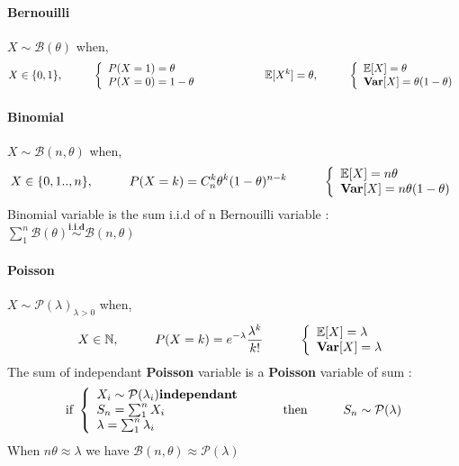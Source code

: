 \documentclass[a4paper,10pt]{article}
\begin{document}
\paragraph{Bernouilli} $X\sim \mathcal{B}(\theta)$ when, 
\[
X \in \{0,1\} , 
\hspace{10mm}
\left\{
\begin{array}{l}
P(X=1)=\theta \\
P(X=0)=1-\theta
\end{array}\right.
\hspace{20mm}
\mathbb{E}[X^k]=\theta,
\hspace{10mm}
\left\{
\begin{array}{l}
\mathbb{E}[X]=\theta \\
\textbf{Var}[X]=\theta (1-\theta)
\end{array}\right.
\]

\paragraph{Binomial} $X\sim \mathcal{B}(n,\theta)$ when,
\[
X \in \{0,1 .. , n\} , 
\hspace{10mm}
P(X=k)=C^k_n\theta ^k (1-\theta)^{n-k} 
\hspace{10mm}
\left\{
\begin{array}{l}
\mathbb{E}[X]=n\theta \\
\textbf{Var}[X]=n \theta (1-\theta) 
\end{array}\right.
\]
Binomial variable is the sum i.i.d of n Bernouilli variable : $\sum_1^n \mathcal{B}(\theta) \stackrel{\textbf{i.i.d}}{\sim}  \mathcal{B}(n,\theta) $

\paragraph{Poisson} $X\sim \mathcal{P}(\lambda)_{\lambda>0}$ when,
\[
X \in \mathbb{N} , 
\hspace{10mm}
P(X=k)= e^{-\lambda}\frac{\lambda^k}{k!}
\hspace{10mm}
\left\{
\begin{array}{l}
\mathbb{E}[X]=\lambda \\
\textbf{Var}[X]=\lambda
\end{array}\right.
\]
The sum of independant \textbf{Poisson} variable is a \textbf{Poisson} variable of sum :
\[
\text{if  } 
\left\{
\begin{array}{l}
X_i \sim \mathcal{P}(\lambda_i) \textbf{independant} \\
S_n = \sum_{1}^{n} X_i \\
\lambda = \sum_{1}^{n} \lambda_i
\end{array}\right.
\hspace{10mm} \text{then} \hspace{10mm}
S_n \sim \mathcal{P}(\lambda)
\]
When $n\theta \approx \lambda$ we have $\mathcal{B}(n,\theta) \approx \mathcal{P}(\lambda)$
\end{document}
